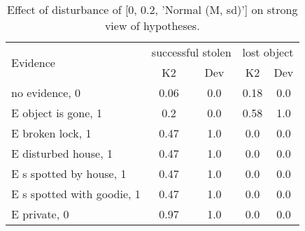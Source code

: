 \begin{table}\begin{tabular}{l|cc|cc}\toprule\multirow{2}{*}{Evidence} & \multicolumn{2}{c}{successful stolen}& \multicolumn{2}{c}{lost object}\\& {K2} & {Dev}& {K2} & {Dev}\\\midrule
no evidence, 0 & \cellcolor{Bittersweet}0.06&\cellcolor{Bittersweet}0.0&\cellcolor{Bittersweet}0.18&\cellcolor{Bittersweet}0.0\\E object is gone, 1 & \cellcolor{Bittersweet}0.2&\cellcolor{Bittersweet}0.0&0.58&1.0\\E broken lock, 1 & 0.47&1.0&\cellcolor{Bittersweet}0.0&\cellcolor{Bittersweet}0.0\\E disturbed house, 1 & 0.47&1.0&\cellcolor{Bittersweet}0.0&\cellcolor{Bittersweet}0.0\\E s spotted by house, 1 & 0.47&1.0&\cellcolor{Bittersweet}0.0&\cellcolor{Bittersweet}0.0\\E s spotted with goodie, 1 & 0.47&1.0&\cellcolor{Bittersweet}0.0&\cellcolor{Bittersweet}0.0\\E private, 0 & \cellcolor{Bittersweet}0.97&\cellcolor{Bittersweet}1.0&\cellcolor{Bittersweet}0.0&\cellcolor{Bittersweet}0.0\\\bottomrule\end{tabular}\caption{Effect of disturbance of [0, 0.2, 'Normal (M, sd)'] on strong view of hypotheses.}\end{table}